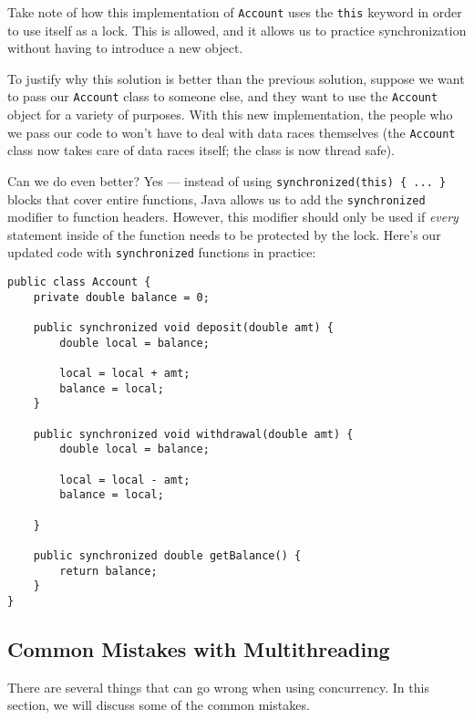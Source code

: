 Take note of how this implementation of \verb!Account! uses the \verb!this! keyword in order to use itself as a lock. This is allowed, and it allows us to practice synchronization without having to introduce a new object.

To justify why this solution is better than the previous solution, suppose we want to pass our \verb!Account! class to someone else, and they want to use the \verb!Account! object for a variety of purposes. With this new implementation, the people who we pass our code to won't have to deal with data races themselves (the \verb!Account! class now takes care of data races itself; the class is now thread safe). 

Can we do even better? Yes --- instead of using \verb!synchronized(this) { ... }! blocks that cover entire functions, Java allows us to add the \verb!synchronized! modifier to function headers. However, this modifier should only be used if \textit{every} statement inside of the function needs to be protected by the lock. Here's our updated code with \verb!synchronized! functions in practice:

\begin{lstlisting}
public class Account {
	private double balance = 0;

	public synchronized void deposit(double amt) {
		double local = balance;
		
		local = local + amt;
		balance = local;
	}

	public synchronized void withdrawal(double amt) {
		double local = balance;
		
		local = local - amt;
		balance = local;

	}

	public synchronized double getBalance() {
		return balance;	
	}
}
\end{lstlisting}

\subsection{Common Mistakes with Multithreading}

There are several things that can go wrong when using concurrency. In this section, we will discuss some of the common mistakes.


